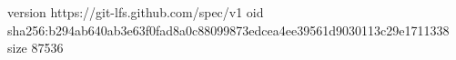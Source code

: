 version https://git-lfs.github.com/spec/v1
oid sha256:b294ab640ab3e63f0fad8a0c88099873edcea4ee39561d9030113c29e1711338
size 87536

